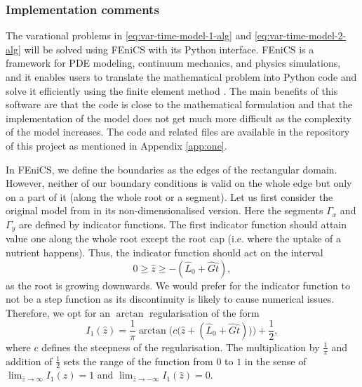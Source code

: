 \documentclass[11pt]{article}
\numberwithin{equation}{section}
\begin{document}
\subsubsection{Implementation comments}

The varational problems in \eqref{eq:var-time-model-1-alg} and \eqref{eq:var-time-model-2-alg} will be solved using FEniCS \cite{AlnaesBlechta2015a} with its Python interface. 
FEniCS is a framework for PDE modeling, continuum mechanics, and physics simulations, and it enables users to translate the mathematical problem into Python code and solve it efficiently using the finite element method \cite{fenics}. The main benefits of this software are that the code is close to the mathematical formulation and that the implementation of the model does not get much more difficult as the complexity of the model increases.
The code and related files are available in the repository of this project as mentioned in Appendix \ref{app:one}.


In FEniCS, we define the boundaries as the edges of the rectangular domain. However, neither of our boundary conditions is valid on the whole edge but only on a part of it (along the whole root or a segment).
Let us first consider the original model from \cite{Ptashnyk-2011} in its non-dimensionalised version. Here the segments \(\Gamma_x\) and \(\Gamma_y\) are defined by indicator functions. 
The first indicator function should attain value one along the whole root except the root cap (i.e. where the uptake of a nutrient happens). Thus, the indicator function should act on the interval 
\[
    0 \geq \hat{z} \geq -(\hat{L}_0 + \hat{G} \hat{t} ),
\]
as the root is growing downwards. We would prefer for the indicator function to not be a step function as its discontinuity is likely to cause numerical issues. Therefore, we opt for an $\arctan$ regularisation of the form
\begin{equation}
    I_1 (\hat z) = \frac{1}{\pi} \arctan\Big(c \big(\hat z + (\hat L_0 + \hat G \hat t) \big) \Big) + \frac{1}{2},
\end{equation}
where $c$ defines the steepness of the regularisation. The multiplication by $\frac{1}{\pi}$ and addition of $\frac{1}{2}$ sets the range of the function from $0$ to $1$ in the sense of $\lim_{\hat z \to \infty} I_1(\hat z) = 1$ and $\lim_{\hat z \to -\infty} I_1(\hat z) = 0$.
\end{document}
